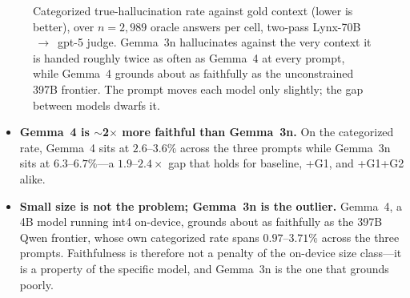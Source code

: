 \begin{figure}[t]
\centering
{}
\caption{Categorized true-hallucination rate against gold context (lower is
better), over $n=2{,}989$ oracle answers per cell, two-pass Lynx-70B$\,\to\,$
gpt-5 judge. Gemma~3n hallucinates against the very context it is handed
roughly twice as often as Gemma~4 at every prompt, while Gemma~4 grounds about
as faithfully as the unconstrained 397B frontier. The prompt moves each model
only slightly; the gap between models dwarfs it.}
\label{fig:faithfulness}
\end{figure}

\begin{itemize}\setlength{\itemsep}{2pt}
  \item \textbf{Gemma~4 is $\sim$2$\times$ more faithful than Gemma~3n.} On
  the categorized rate, Gemma~4 sits at $2.6$--$3.6\%$ across the three
  prompts while Gemma~3n sits at $6.3$--$6.7\%$---a $1.9$--$2.4\times$ gap that
  holds for baseline, \mbox{+G1}, and \mbox{+G1+G2} alike.
  \item \textbf{Small size is not the problem; Gemma~3n is the outlier.}
  Gemma~4, a 4B model running int4 on-device, grounds about as faithfully as
  the 397B Qwen frontier, whose own categorized rate spans $0.97$--$3.71\%$
  across the three prompts. Faithfulness is therefore not a penalty of the
  on-device size class---it is a property of the specific model, and Gemma~3n
  is the one that grounds poorly.
\end{itemize}

